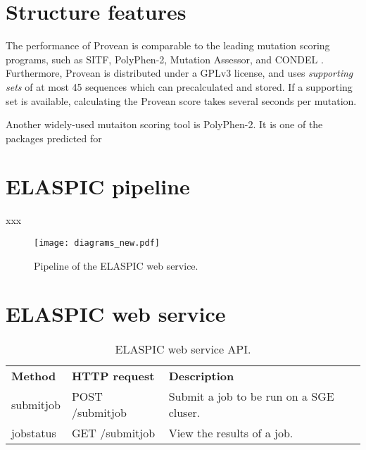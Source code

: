 \section{Structure features}

The performance of Provean is comparable to the leading mutation scoring programs, such as SITF, PolyPhen-2, Mutation Assessor, and CONDEL \cite{choi_predicting_2012}. Furthermore, Provean is distributed under a GPLv3 license, and uses \textit{supporting sets} of at most 45 sequences which can precalculated and stored. If a supporting set is available, calculating the Provean score takes several seconds per mutation.

Another widely-used mutaiton scoring tool is PolyPhen-2. It is one of the packages predicted for






\section{ELASPIC pipeline}


xxx

\begin{figure}[H]
	\centering
	\texttt{[image: diagrams\_new.pdf]}
	\caption[pipeline]{Pipeline of the ELASPIC web service.}
\end{figure}



\section{ELASPIC web service}

\begin{table}[H]
	\centering
	\caption{ELASPIC web service API.}
	\label{my-label}
	\begin{tabular}{lll}
	\textbf{Method} & \textbf{HTTP request} & \textbf{Description} \\
	submitjob & POST /submitjob & Submit a job to be run on a SGE cluser. \\
	jobstatus & GET /submitjob & View the results of a job.
	\end{tabular}
\end{table}
